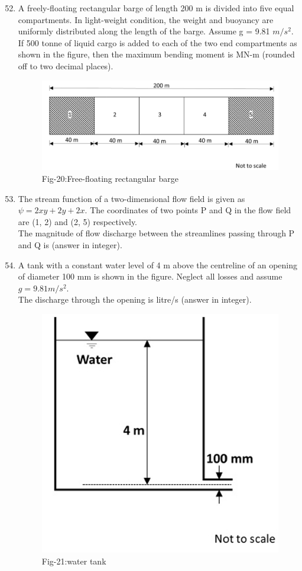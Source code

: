 \documentclass[journal]{IEEEtran}
\theoremstyle{remark}
\begin{document}
\begin{enumerate}[itemsep=1em]
\setcounter{enumi}{51}
\item A freely-floating rectangular barge of length 200 m is divided into five equal compartments. In light-weight condition, the weight and buoyancy are uniformly distributed along the length of the barge. Assume g = 9.81 $m/s^2$. \\
If 500 tonne of liquid cargo is added to each of the two end compartments as shown in the figure, then the maximum bending moment is \underline{\hspace{2cm}} MN-m (rounded off to two decimal places). 
\begin{figure}[H]
    \centering
    \includegraphics[width=0.4\columnwidth]{figs/fig-20.jpeg}
    \caption*{Fig-20:Free-floating rectangular barge}
    \label{fig:20}
\end{figure}
\end{enumerate}

\begin{enumerate}[itemsep=1em]
\setcounter{enumi}{52}
\item The stream function of a two-dimensional flow field is given as  
$\psi=2xy+2y+2x$. The coordinates of two points P and Q in the flow field are 
(1, 2) and (2, 5) respectively. \\
The magnitude of flow discharge between the streamlines passing through P and Q is \underline{\hspace{2cm}}(answer in integer). 
\end{enumerate}

\begin{enumerate}[itemsep=1em]
\setcounter{enumi}{53}
\item A tank with a constant water level of 4 m above the centreline of an opening of diameter 100 mm is shown in the figure. Neglect all losses and assume   $g = 9.81 m/s^2$. \\ 
The discharge through the opening is \underline{\hspace{2cm}} litre/s (answer in integer).  
\newpage
\vspace*{0.25cm}
\begin{figure}[H]
    \centering
    \includegraphics[width=0.4\columnwidth]{figs/fig-21.jpeg}
    \caption*{Fig-21:water tank}
    \label{fig:21}
\end{figure}
\end{enumerate}
\end{document}
